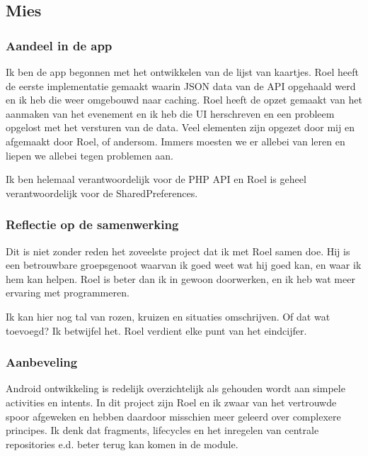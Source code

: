 \documentclass[dutch]{report}
\begin{document}
	\subsection{Mies}

	\subsubsection{Aandeel in de app}
	Ik ben de app begonnen met het ontwikkelen van de lijst van kaartjes. Roel heeft de eerste implementatie gemaakt waarin JSON data 
	van de API opgehaald werd en ik heb die weer omgebouwd naar caching. Roel heeft de opzet gemaakt van het aanmaken van het evenement
	en ik heb die UI herschreven en een probleem opgelost met het versturen van de data. Veel elementen zijn opgezet door mij en afgemaakt
	door Roel, of andersom. Immers moesten we er allebei van leren en liepen we allebei tegen problemen aan. 
	
	Ik ben helemaal verantwoordelijk voor de PHP API en Roel is geheel verantwoordelijk voor de SharedPreferences. 
	\subsubsection{Reflectie op de samenwerking}
	Dit is niet zonder reden het zoveelste project dat ik met Roel samen doe. Hij is een betrouwbare groepsgenoot waarvan ik goed weet wat
	hij goed kan, en waar ik hem kan helpen. Roel is beter dan ik in gewoon doorwerken, en ik heb wat meer ervaring met programmeren.
	
	Ik kan hier nog tal van rozen, kruizen en situaties omschrijven. Of dat wat toevoegd? Ik betwijfel het. Roel verdient elke punt van 
	het eindcijfer.
	
	\subsubsection{Aanbeveling}
	Android ontwikkeling is redelijk overzichtelijk als gehouden wordt aan simpele activities en intents. In dit project zijn Roel en ik 
	zwaar van het vertrouwde spoor afgeweken en hebben daardoor misschien meer geleerd over complexere principes. Ik denk dat fragments,
	lifecycles en het inregelen van centrale repositories e.d. beter terug kan komen in de module. 
	
\end{document}
